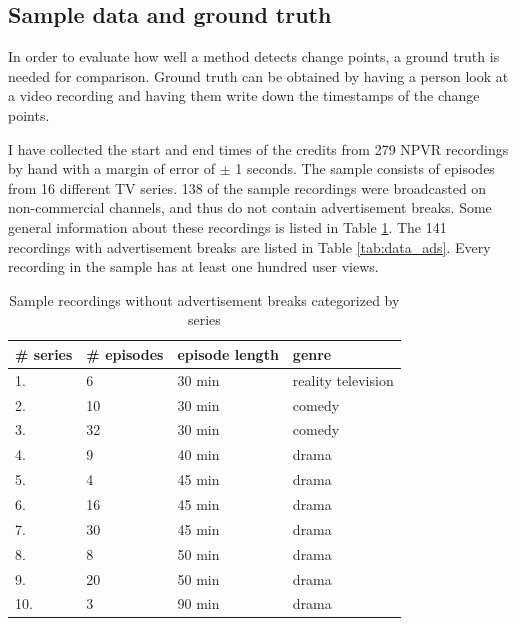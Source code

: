 \subsection{Sample data and ground truth} \label{subsec:groundtruth}

In order to evaluate how well a method detects change points, a ground truth is needed for comparison. Ground truth can be obtained by having a person look at a video recording and having them write down the timestamps of the change points.

I have collected the start and end times of the credits from 279 NPVR recordings by hand with a margin of error of $\pm$ 1 seconds. The sample consists of episodes from 16 different TV series. 138 of the sample recordings were broadcasted on non-commercial channels, and thus do not contain advertisement breaks. Some general information about these recordings is listed in Table \ref{tab:data_no_ads}. The 141 recordings with advertisement breaks are listed in Table \ref{tab:data_ads}. Every recording in the sample has at least one hundred user views.

\begin{table}[H]
    \begin{center}
    \begin{tabular}{|p{15mm}|p{20mm}|p{28mm}|p{30mm}|} %
        \hline
        \textbf{\# series} & \textbf{\# episodes} & \textbf{episode length} & \textbf{genre}  \\ \hline
        1. &  6 & 30 min & reality television\\ \hline
        2. & 10 & 30 min & comedy\\ \hline
        3. & 32 & 30 min & comedy\\ \hline
        4. &  9 & 40 min & drama\\ \hline
        5. &  4 & 45 min & drama\\ \hline
        6. &  16 & 45 min & drama\\ \hline
        7. & 30 & 45 min & drama\\ \hline
        8. &  8 & 50 min & drama\\ \hline
        9. & 20 & 50 min & drama\\ \hline
        10. & 3 & 90 min & drama\\ \hline
    \end{tabular}
    \end{center}
    \caption{Sample recordings without advertisement breaks categorized by series}
    \label{tab:data_no_ads}
\end{table}


